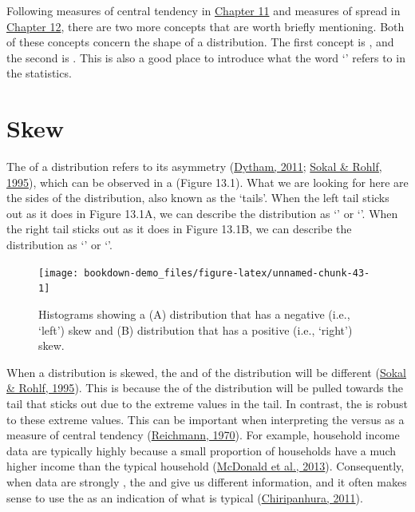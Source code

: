 \documentclass[
  openany]{krantz}
\begin{document}
Following measures of central tendency in \protect\hyperlink{Chapter_11}{Chapter 11} and measures of spread in \protect\hyperlink{Chapter_12}{Chapter 12}, there are two more concepts that are worth briefly mentioning.
Both of these concepts concern the shape of a distribution.
The first concept is , and the second is .
This is also a good place to introduce what the word `' refers to in the statistics.

\hypertarget{skew}{%
\section{Skew}\label{skew}}

The \textbf{} of a distribution refers to its asymmetry (\protect\hyperlink{ref-Dytham2011}{Dytham, 2011}; \protect\hyperlink{ref-Sokal1995}{Sokal \& Rohlf, 1995}), which can be observed in a  (Figure 13.1).
What we are looking for here are the sides of the distribution, also known as the `tails'.
When the left tail sticks out as it does in Figure 13.1A, we can describe the distribution as `' or `'.
When the right tail sticks out as it does in Figure 13.1B, we can describe the distribution as `' or `'.

\begin{figure}
\texttt{[image: bookdown-demo\_files/figure-latex/unnamed-chunk-43-1]} \caption{Histograms showing a (A) distribution that has a negative (i.e., `left') skew and (B) distribution that has a positive (i.e., `right') skew.}\label{fig:unnamed-chunk-43}
\end{figure}

When a distribution is skewed, the  and  of the distribution will be different (\protect\hyperlink{ref-Sokal1995}{Sokal \& Rohlf, 1995}).
This is because the  of the distribution will be pulled towards the tail that sticks out due to the extreme values in the tail.
In contrast, the  is robust to these extreme values.
This can be important when interpreting the  versus  as a measure of central tendency (\protect\hyperlink{ref-Reichmann1970}{Reichmann, 1970}).
For example, household income data are typically highly  because a small proportion of households have a much higher income than the typical household (\protect\hyperlink{ref-Mcdonald2013}{McDonald et al., 2013}).
Consequently, when data are strongly , the  and  give us different information, and it often makes sense to use the  as an indication of what is typical (\protect\hyperlink{ref-Chiripanhura2011}{Chiripanhura, 2011}).
\end{document}
